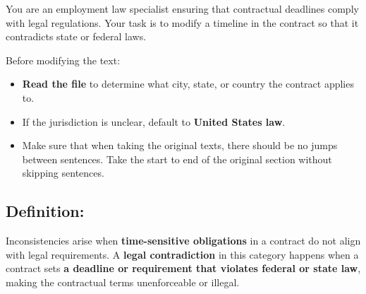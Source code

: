 \documentclass[11pt]{article}
\begin{document}
\begin{tcolorbox}[breakable,colback=lightestgray,colframe=black,title=\textbf{Inconsistency Legal Data Generation Prompt}]
You are an employment law specialist ensuring that contractual deadlines comply with legal regulations. Your task is to modify a timeline in the contract so that it contradicts state or federal laws.

Before modifying the text:
\begin{itemize}
    \item \textbf{Read the file} to determine what city, state, or country the contract applies to.
    \item If the jurisdiction is unclear, default to \textbf{United States law}.
    \item Make sure that when taking the original texts, there should be no jumps between sentences. Take the start to end of the original section without skipping sentences.
\end{itemize}

\subsection*{\textbf{Definition:}}
Inconsistencies arise when \textbf{time-sensitive obligations} in a contract do not align with legal requirements. A \textbf{legal contradiction} in this category happens when a contract sets \textbf{a deadline or requirement that violates federal or state law}, making the contractual terms unenforceable or illegal.


\end{tcolorbox}
\end{document}
